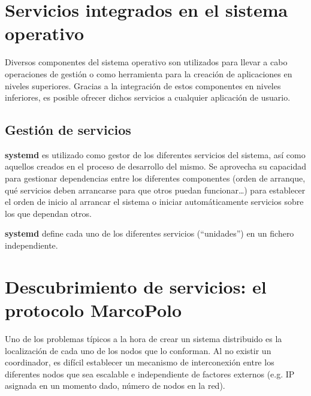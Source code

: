 \section{Servicios integrados en el sistema operativo}

Diversos componentes del sistema operativo son utilizados para llevar a cabo operaciones de gestión o como herramienta para la creación de aplicaciones en niveles superiores. Gracias a la integración de estos componentes en niveles inferiores, es posible ofrecer dichos servicios a cualquier aplicación de usuario. 


\subsection{Gestión de servicios}

\textbf{systemd} es utilizado como gestor de los diferentes servicios del sistema, así como aquellos creados en el proceso de desarrollo del mismo. Se aprovecha su capacidad para gestionar dependencias entre los diferentes componentes (orden de arranque, qué servicios deben arrancarse para que otros puedan funcionar\dots) para establecer el orden de inicio al arrancar el sistema o iniciar automáticamente servicios sobre los que dependan otros.

\textbf{systemd} define cada uno de los diferentes servicios (``unidades'') en un fichero independiente.

\section{Descubrimiento de servicios: el protocolo MarcoPolo}

Uno de los problemas típicos a la hora de crear un sistema distribuido es la localización de cada uno de los nodos que lo conforman. Al no existir un coordinador, es difícil establecer un mecanismo de interconexión entre los diferentes nodos que sea escalable e independiente de factores externos (e.g. IP asignada en un momento dado, número de nodos en la red).



